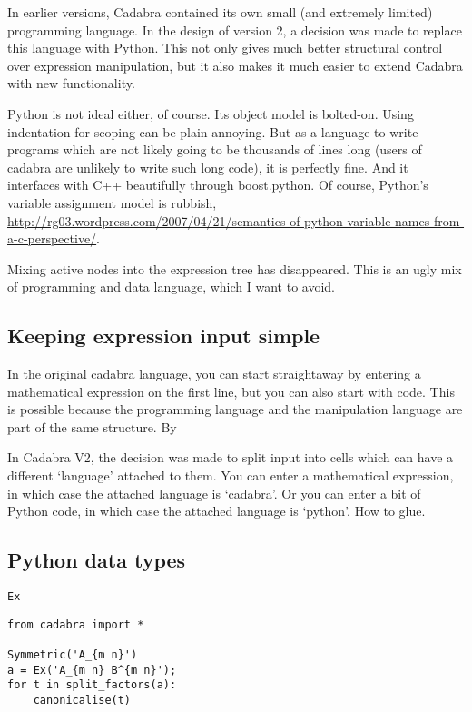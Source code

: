 \documentclass[11pt]{article}
\begin{document}
In earlier versions, Cadabra contained its own small (and extremely
limited) programming language. In the design of version 2, a decision
was made to replace this language with Python. This not only gives
much better structural control over expression manipulation, but it
also makes it much easier to extend Cadabra with new functionality.

Python is not ideal either, of course. Its object model is bolted-on.
Using indentation for scoping can be plain annoying.  But as a
language to write programs which are not likely going to be thousands
of lines long (users of cadabra are unlikely to write such long code),
it is perfectly fine. And it interfaces with C++ beautifully through
boost.python. Of course, Python's variable assignment model is
rubbish,
\url{http://rg03.wordpress.com/2007/04/21/semantics-of-python-variable-names-from-a-c-perspective/}.

Mixing active nodes into the expression tree has disappeared. This is
an ugly mix of programming and data language, which I want to avoid.


\subsection{Keeping expression input simple}

In the original cadabra language, you can start straightaway by
entering a mathematical expression on the first line, but you can also
start with code.  This is possible because the programming language
and the manipulation language are part of the same structure. By

In Cadabra V2, the decision was made to split input into cells which
can have a different `language' attached to them. You can enter a
mathematical expression, in which case the attached language is
`cadabra'. Or you can enter a bit of Python code, in which case the
attached language is `python'. How to glue.

\subsection{Python data types}

\begin{description}
\item[{\tt Ex}] 
\end{description}


\begin{lstlisting}
from cadabra import *

Symmetric('A_{m n}')
a = Ex('A_{m n} B^{m n}');
for t in split_factors(a):
    canonicalise(t)
\end{lstlisting}
\end{document}
